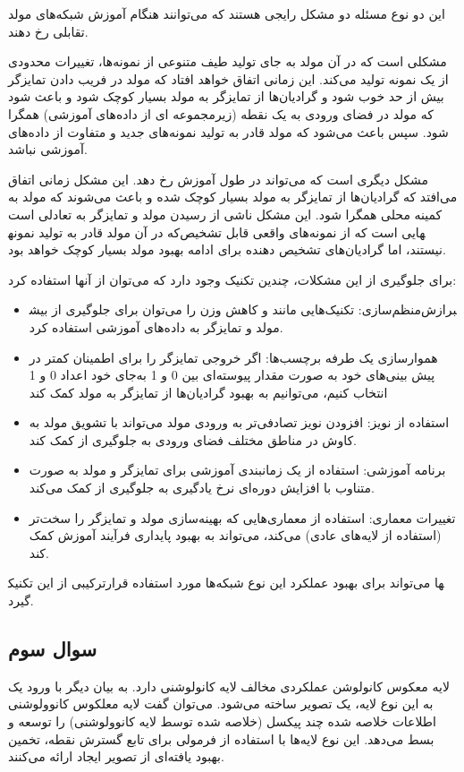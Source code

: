 \documentclass{article}
\begin{document}
این دو نوع مسئله دو مشکل رایجی هستند که می‌توانند هنگام آموزش شبکه‌های مولد تقابلی رخ دهند.

 مشکلی است که در آن مولد به جای تولید طیف متنوعی از نمونه‌ها، تغییرات محدودی از یک نمونه تولید می‌کند. این زمانی اتفاق خواهد افتاد که مولد در فریب دادن تمایزگر بیش از حد خوب شود و گرادیان‌ها از تمایزگر به مولد بسیار کوچک شود و باعث شود که مولد در فضای ورودی به یک نقطه (زیرمجموعه ای از داده‌های آموزشی) همگرا شود. سپس باعث می‌شود که مولد قادر به تولید نمونه‌های جدید و متفاوت از داده‌های آموزشی نباشد.

 مشکل دیگری است که می‌تواند در طول آموزش رخ دهد. این مشکل زمانی اتفاق می‌افتد که گرادیان‌ها از تمایزگر به مولد بسیار کوچک شده و باعث می‌شوند که مولد به کمینه محلی همگرا شود. این مشکل ناشی از رسیدن مولد و تمایزگر به تعادلی است که در آن مولد قادر به تولید نمونه‎هایی است که از نمونه‌های واقعی قابل تشخیص نیستند، اما گرادیان‌های تشخیص دهنده برای ادامه بهبود مولد بسیار کوچک خواهد بود.

برای جلوگیری از این مشکلات، چندین تکنیک وجود دارد که می‌توان از آنها استفاده کرد:
\begin{itemize}
    \item منظم‌سازی: تکنیک‌هایی مانند  و کاهش وزن را می‌توان برای جلوگیری از بیش‎برازش مولد و تمایزگر به داده‌های آموزشی استفاده کرد.
    \item هموارسازی یک طرفه برچسب‌ها: اگر خروجی تمایزگر را برای اطمینان کمتر در پیش بینی‌های خود به صورت مقدار پیوسته‌ای بین 0 و 1 به‌جای خود اعداد 0 و 1 انتخاب کنیم، می‌توانیم به بهبود گرادیان‌ها از تمایزگر به مولد کمک کند
    \item استفاده از نویز: افزودن نویز تصادفی‌تر به ورودی مولد می‌تواند با تشویق مولد به کاوش در مناطق مختلف فضای ورودی به جلوگیری از  کمک کند.
    \item برنامه آموزشی: استفاده از یک زمانبندی آموزشی برای تمایزگر و مولد به صورت متناوب با افزایش دوره‌ای نرخ یادگیری به جلوگیری از  کمک می‌کند.
    \item تغییرات معماری: استفاده از معماری‌هایی که بهینه‌سازی مولد و تمایزگر را سخت‌تر (استفاده از لایه‌های عادی) می‌کند، می‌تواند به بهبود پایداری فرآیند آموزش کمک کند.
\end{itemize}

ترکیبی از این تکنیک‎ها می‌تواند برای بهبود عملکرد این نوع شبکه‌ها مورد استفاده قرار گیرد. 
\subsection{سوال سوم}
لایه معکوس کانولوشن عملکردی مخالف لایه کانولوشنی دارد. به بیان دیگر با ورود یک  به این نوع لایه، یک تصویر ساخته می‌شود. می‌توان گفت لایه معلکوس کانوولوشنی اطلاعات خلاصه شده چند پیکسل (خلاصه شده توسط لایه کانوولوشنی) را توسعه و بسط می‌دهد. این نوع لایه‌ها با استفاده از فرمولی برای تابع گسترش نقطه، تخمین بهبود یافته‌ای از تصویر ایجاد ارائه می‌کنند.
\end{document}
